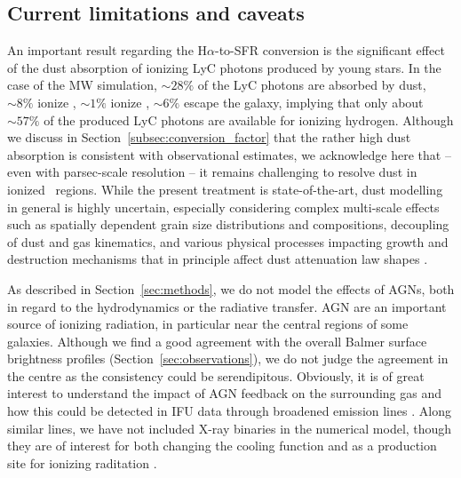 \documentclass[fleqn,usenatbib]{mnras}
\newcommand\HII{\ion{H}{II}~} %
\newcommand\HeI{\ion{He}{I}} %
\newcommand\HeII{\ion{He}{II}} %
\begin{document}
\subsection{Current limitations and caveats}
\label{subsec:caveats}

An important result regarding the H$\alpha$-to-SFR conversion is the significant effect of the dust absorption of ionizing LyC photons produced by young stars. In the case of the MW simulation, $\sim28\%$ of the LyC photons are absorbed by dust, $\sim8\%$ ionize \HeI, $\sim1\%$ ionize \HeII, $\sim6\%$ escape the galaxy, implying that only about $\sim57\%$ of the produced LyC photons are available for ionizing hydrogen. Although we discuss in Section~\ref{subsec:conversion_factor} that the rather high dust absorption is consistent with observational estimates, we acknowledge here that -- even with parsec-scale resolution -- it remains challenging to resolve dust in ionized \HII regions. While the present treatment is state-of-the-art, dust modelling in general is highly uncertain, especially considering complex multi-scale effects such as spatially dependent grain size distributions and compositions, decoupling of dust and gas kinematics, and various physical processes impacting growth and destruction mechanisms that in principle affect dust attenuation law shapes \citep[e.g.,][]{draine11, aoyama18, mckinnon18, mckinnon19, li19_dust}.

As described in Section~\ref{sec:methods}, we do not model the effects of AGNs, both in regard to the hydrodynamics or the radiative transfer. AGN are an important source of ionizing radiation, in particular near the central regions of some galaxies. Although we find a good agreement with the overall Balmer surface brightness profiles (Section~\ref{sec:observations}), we do not judge the agreement in the centre as the consistency could be serendipitous. Obviously, it is of great interest to understand the impact of AGN feedback on the surrounding gas and how this could be detected in IFU data through broadened emission lines \citep[e.g.,][]{forster-schreiber14, genzel14b}. Along similar lines, we have not included X-ray binaries in the numerical model, though they are of interest for both changing the cooling function \citep[e.g.,][]{kannan16} and as a production site for ionizing raditation \citep[e.g.,][]{schaerer19, senchyna20}.
\end{document}
